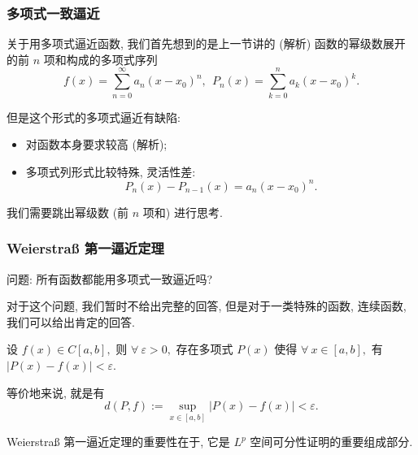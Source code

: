 
\begin{frame}
\frametitle{多项式一致逼近}

关于用多项式逼近函数, 我们首先想到的是上一节讲的 (解析) 函数的幂级数展开的前 $n$ 项和构成的多项式序列
\[f(x) = \sum_{n=0}^\infty a_n (x - x_0)^n, ~~ P_n(x) = \sum_{k=0}^n a_k (x - x_0)^k.\]

\pause
\vspace{1em}

但是这个形式的多项式逼近有缺陷:
\begin{itemize}
\item 对函数本身要求较高 (解析);
\item 多项式列形式比较特殊, 灵活性差:
\[P_n(x) - P_{n-1}(x) = a_n (x - x_0)^n.\]
\end{itemize}
我们需要跳出幂级数 (前 $n$ 项和) 进行思考.

\end{frame}


\begin{frame}
\frametitle{Weierstraß 第一逼近定理}

\alert{问题}: 所有函数都能用多项式一致逼近吗?

\pause
\vspace{1em}

对于这个问题, 我们暂时不给出完整的回答, 但是对于一类特殊的函数, \alert{连续函数}, 我们可以给出肯定的回答.

\pause

\begin{thm}
设 $f(x) \in C[a, b],$ 则 $\forall~\varepsilon > 0,$ 存在多项式 $P(x)$ 使得 $\forall~x\in [a, b],$ 有 $|P(x) - f(x)| < \varepsilon.$
\end{thm}

\pause

等价地来说, 就是有
\[
d(P, f) := \sup_{x\in[a,b]}|P(x) - f(x)| < \varepsilon.
\]

\pause

Weierstraß 第一逼近定理的重要性在于, 它是 $L^p$ 空间可分性证明的重要组成部分.

\end{frame}


